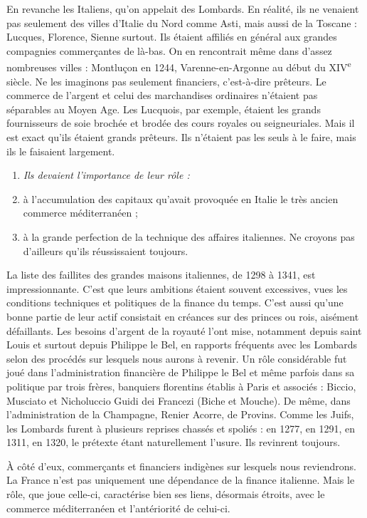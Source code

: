 \documentclass[french,twoside]{book} %
\newlength{\listmod}
\newcommand{\listhead}[1]{\hspace{-1\listmod}\emph{#1}}
\begin{document}
En revanche les Italiens, qu’on appelait des Lombards. En réalité, ils ne venaient pas seulement des villes d’Italie du Nord comme Asti, mais aussi de la Toscane : Lucques, Florence, Sienne surtout. Ils étaient affiliés en général aux grandes compagnies commerçantes de là-bas. On en rencontrait même dans d’assez nombreuses villes : Montluçon en 1244, Varenne-en-Argonne au début du XIV\textsuperscript{e} siècle. Ne les imaginons pas seulement financiers, c’est-à-dire prêteurs. Le commerce de l’argent et celui des marchandises ordinaires n’étaient pas séparables au Moyen Age. Les Lucquois, par exemple, étaient les grands fournisseurs de soie brochée et brodée des cours royales ou seigneuriales. Mais il est exact qu’ils étaient  
\label{p89} grands prêteurs. Ils n’étaient pas les seuls à le faire, mais ils le faisaient largement.\par

\begin{enumerate}[itemsep=0pt,]
\item[]\listhead{Ils devaient l’importance de leur rôle :}
\item à l’accumulation des capitaux qu’avait provoquée en Italie le très ancien commerce méditerranéen ;
\item à la grande perfection de la technique des affaires italiennes. Ne croyons pas d’ailleurs qu’ils réussissaient toujours.

\end{enumerate}\noindent La liste des faillites des grandes maisons italiennes, de 1298 à 1341, est impressionnante. C’est que leurs ambitions étaient souvent excessives, vues les conditions techniques et politiques de la finance du temps. C’est aussi qu’une bonne partie de leur actif consistait en créances sur des princes ou rois, aisément défaillants. Les besoins d’argent de la royauté l’ont mise, notamment depuis saint Louis et surtout depuis Philippe le Bel, en rapports fréquents avec les {\term Lombards} selon des procédés sur lesquels nous aurons à revenir. Un rôle considérable fut joué dans l’administration financière de Philippe le Bel et même parfois dans sa politique par trois frères, banquiers florentins établis à Paris et associés : Biccio, Musciato et Nicholuccio Guidi dei Francezi (Biche et Mouche). De même, dans l’administration de la Champagne, Renier Acorre, de Provins. Comme les Juifs, les Lombards furent à plusieurs reprises chassés et spoliés : en 1277, en 1291, en 1311, en 1320, le prétexte étant naturellement l’usure. Ils revinrent toujours.\par
À côté d’eux, commerçants et financiers indigènes sur lesquels nous reviendrons. La France n’est pas uniquement une dépendance de la finance italienne. Mais le rôle, que joue celle-ci, caractérise bien ses liens, désormais étroits, avec le commerce méditerranéen et l’antériorité de celui-ci.
\end{document}
